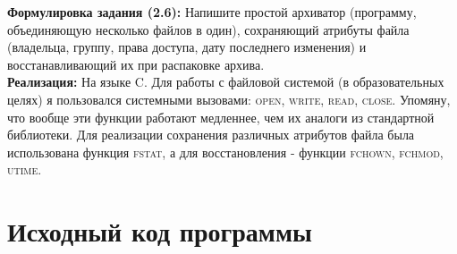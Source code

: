 





\pagebreak

\textbf{Формулировка задания (2.6):}  Напишите простой архиватор (программу, объединяющую несколько файлов в
один), сохраняющий атрибуты файла (владельца, группу, права доступа, дату последнего изменения) и восстанавливающий их при распаковке архива. \\

\textbf{Реализация:} На языке \textsc{C}. Для работы с файловой системой (в образовательных целях) я пользовался системными вызовами: 
\textsc{open, write, read, close}. Упомяну, что вообще эти функции работают медленнее, чем их аналоги из стандартной библиотеки. Для реализации
сохранения различных атрибутов файла была использована функция \textsc{fstat}, а для восстановления - функции \textsc{fchown, fchmod, utime}.

\section*{Исходный код программы}
\lstset{language=c, caption=fz archiver,%
label=source-code, basicstyle=\footnotesize,%
numbers=left, numberstyle=\footnotesize, numbersep=5pt, frame=single, breaklines=true, breakatwhitespace=false,%
inputencoding=utf8x}




